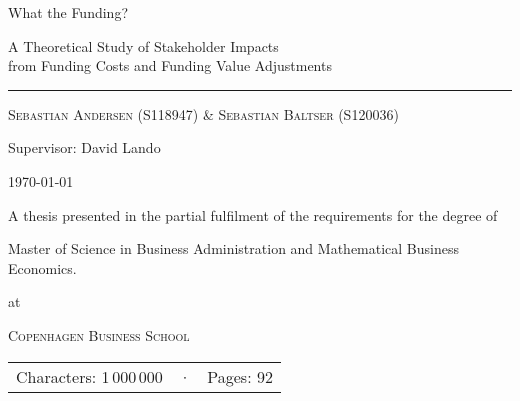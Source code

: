 \documentclass[main.tex]{subfiles}
\begin{document}
	\begin{titlepage}
		\centering
		\vspace{5cm}
		{\Huge What the Funding? \par}
		{\Large A Theoretical Study of Stakeholder Impacts \\ 
		from Funding Costs and Funding Value Adjustments \par}
		\rule{\textwidth}{1px}\par
		{\scshape\large Sebastian Andersen {\small(S118947)} \& Sebastian Baltser {\small(S120036)}\par}
		
		Supervisor: David Lando \\
		
		\vfill
		
		{\Large \today \par}		
		{A thesis presented in the partial fulfilment
		of the requirements for the degree of \\}
		{\Large Master of Science in Business Administration and Mathematical Business Economics. \par}
		at \par 
		{\scshape\LARGE Copenhagen Business School\par}
		\vspace{0.5cm}
		\begin{tabular}{>{\raggedleft\arraybackslash}m{5cm}>{\centering\arraybackslash}m{0.75cm}>{\raggedright\arraybackslash}m{5cm}}
		Characters: 1\,000\,000 & · & Pages: 92 \\
		\end{tabular}
		
		\thispagestyle{empty}
	\end{titlepage}
\end{document}
